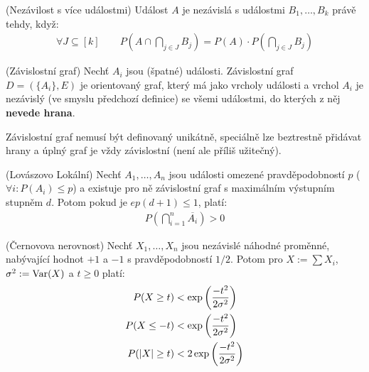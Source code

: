 \df (Nezávilost s více událostmi) Událost $A$ je nezávislá s událostmi {$B_1, 
\dots, B_k$} právě tehdy, když:
\begin{align}
	\forall J \subseteq [k] \qquad P\left(A\cap\bigcap_{j\in J} B_j\right) = 
	P(A) \cdot P\left(\bigcap_{j \in J} B_j\right)
\end{align}

\df (Závislostní graf) Nechť $A_i$ jsou (špatné) události. Závislostní graf $D =
(\{A_i\}, E)$ je orientovaný graf, který má jako vrcholy události a vrchol $A_i$ 
je nezávislý (ve smyslu předchozí definice) se všemi událostmi, do kterých z něj 
{\bf nevede hrana}. 

\poz Závislostní graf nemusí být definovaný unikátně, speciálně lze beztrestně 
přidávat hrany a úplný graf je vždy závislostní (není ale příliš užitečný).

\lm (Lovászovo Lokální) Nechť $A_1, \dots, A_n$ jsou události omezené 
pravděpodobností $p$ ($\forall i: P(A_i) \leq p$) a existuje pro ně závislostní 
graf s maximálním výstupním stupněm $d$. Potom pokud je $ep(d+1) \leq 1$, platí:
\begin{align}
	P\left(\bigcap_{i=1}^n \overline{A_i}\right) > 0
\end{align}

\vt (Černovova nerovnost) Nechť $X_1, \dots, X_n$ jsou nezávislé náhodné 
proměnné, nabývající hodnot $+1$ a $-1$ s pravděpodobností $1/2$. Potom pro $X 
:= \sum X_i$, $\sigma^2 := \operatorname{Var}(X)$ a $t \geq 0$ platí:
\begin{align}
	P(X \geq t) &< \exp\left({-t^2 \over 2 \sigma^2}\right) \\
	P(X \leq -t) &< \exp\left({-t^2 \over 2 \sigma^2}\right) \\
	P(|X| \geq t) & < 2\exp\left({-t^2 \over 2 \sigma^2}\right)
\end{align}

